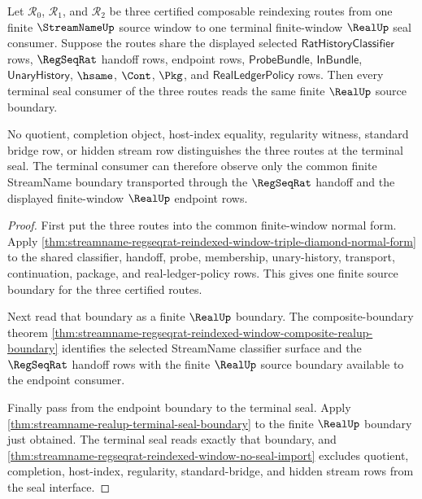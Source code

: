 \begin{theorem}
\label{thm:streamname-regseqrat-reindexed-window-triple-terminal-seal-determinacy}
Let $\mathcal R_0$, $\mathcal R_1$, and $\mathcal R_2$ be three certified
composable reindexing routes from one finite $\StreamNameUp$ source window to
one terminal finite-window $\RealUp$ seal consumer. Suppose the routes share the
displayed selected $\mathsf{RatHistoryClassifier}$ rows, $\RegSeqRat$ handoff
rows, endpoint rows, $\mathsf{ProbeBundle}$, $\mathsf{InBundle}$,
$\mathsf{UnaryHistory}$, $\hsame$, $\Cont$, $\Pkg$, and
$\mathsf{RealLedgerPolicy}$ rows. Then every terminal seal consumer of the
three routes reads the same finite $\RealUp$ source boundary.

No quotient, completion object, host-index equality, regularity witness,
standard bridge row, or hidden stream row distinguishes the three routes at
the terminal seal. The terminal consumer can therefore observe only the common
finite StreamName boundary transported through the $\RegSeqRat$ handoff and
the displayed finite-window $\RealUp$ endpoint rows.
\end{theorem}
\begin{proof}
First put the three routes into the common finite-window normal form. Apply
\autoref{thm:streamname-regseqrat-reindexed-window-triple-diamond-normal-form}
to the shared classifier, handoff, probe, membership, unary-history,
transport, continuation, package, and real-ledger-policy rows. This gives one
finite source boundary for the three certified routes.

Next read that boundary as a finite $\RealUp$ boundary. The composite-boundary
theorem
\autoref{thm:streamname-regseqrat-reindexed-window-composite-realup-boundary}
identifies the selected StreamName classifier surface and the $\RegSeqRat$
handoff rows with the finite $\RealUp$ source boundary available to the
endpoint consumer.

Finally pass from the endpoint boundary to the terminal seal. Apply
\autoref{thm:streamname-realup-terminal-seal-boundary} to the finite
$\RealUp$ boundary just obtained. The terminal seal reads exactly that
boundary, and
\autoref{thm:streamname-regseqrat-reindexed-window-no-seal-import} excludes
quotient, completion, host-index, regularity, standard-bridge, and hidden
stream rows from the seal interface.
\end{proof}

